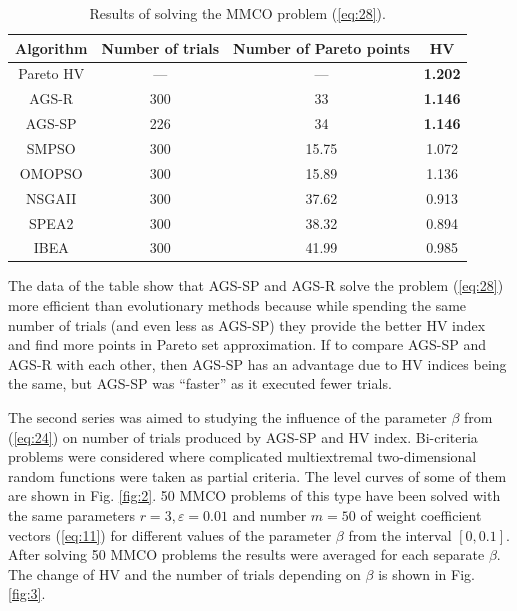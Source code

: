 \documentclass[runningheads]{llncs}
\begin{document}
\begin{table}[ht]
\caption{Results of solving the MMCO problem (\ref{eq:28}).}
\label{tab:01}
\center
\begin{tabular}{|c|c|c|c|}
\hline
\textbf{Algorithm} & \textbf{Number of trials} & \textbf{Number of Pareto points} & \textbf{HV}    \\ \hline
Pareto HV          & ---                       & ---                              & \textbf{1.202} \\
AGS-R              & 300                       & 33                               & \textbf{1.146} \\
AGS-SP             & 226                       & 34                               & \textbf{1.146} \\
SMPSO              & 300                       & 15.75                            & 1.072          \\
OMOPSO             & 300                       & 15.89                            & 1.136          \\
NSGAII             & 300                       & 37.62                            & 0.913          \\
SPEA2              & 300                       & 38.32                            & 0.894          \\
IBEA               & 300                       & 41.99                            & 0.985          \\ \hline
\end{tabular}
\end{table}

The data of the table show that AGS-SP and AGS-R solve the problem (\ref{eq:28}) more efficient than evolutionary methods because while spending the same number of trials (and even less as AGS-SP) they provide the  better HV index and find more points in Pareto set approximation. If to compare AGS-SP and AGS-R with each other, then AGS-SP has an advantage due to HV indices being the same, but AGS-SP was ``faster'' as it executed fewer trials.

The second series was aimed to studying the influence of the parameter $\beta$ from (\ref{eq:24}) on number of trials produced by AGS-SP and HV index. Bi-criteria problems were considered where complicated multiextremal two-dimensional random functions \cite{Grishagin2015_2} were taken as partial criteria. The level curves of some of them are shown in Fig.  \ref{fig:2}. 50 MMCO problems of this type have been solved with the same parameters $r=3, \varepsilon=0.01$ and number $m=50$ of weight coefficient vectors (\ref{eq:11}) for different values of the parameter $\beta$ from the interval $[0,0.1]$. After solving 50 MMCO problems the results were averaged for each separate $\beta$. The change of HV and the number of trials depending on $\beta$ is shown in Fig. \ref{fig:3}.
\end{document}
